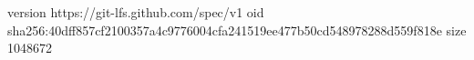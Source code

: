 version https://git-lfs.github.com/spec/v1
oid sha256:40dff857cf2100357a4c9776004cfa241519ee477b50cd548978288d559f818e
size 1048672
